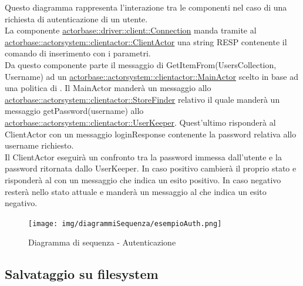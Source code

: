 \documentclass{scalatekids-article}
\begin{document}
Questo diagramma rappresenta l'interazione tra le componenti nel caso di una richiesta di autenticazione di un utente.\\
La componente \hyperref[sec:actorbase::driver::client::Connection]{actorbase::driver::client::Connection} 
manda tramite  al \hyperref[sec:actorbase::actorsystem::clientactor::ClientActor]{actorbase::actorsystem::clientactor::ClientActor} 
una string RESP contenente il comando di inserimento  con 
i parametri.\\ %
Da questo componente parte il messaggio di GetItemFrom(UsersCollection, Username) ad un \hyperref[sec:actorbase::actorsystem::clientactor::MainActor]{actorbase::actorsystem::clientactor::MainActor} scelto in base ad una 
politica di . Il MainActor manderà un messaggio allo \hyperref[sec:actorbase::actorsystem::clientactor::StoreFinder]{actorbase::actorsystem::clientactor::StoreFinder} relativo il quale manderà un messaggio getPassword(username) allo \hyperref[sec:actorbase::actorsystem::clientactor::UserKeeper]{actorbase::actorsystem::clientactor::UserKeeper}. Quest'ultimo risponderà al ClientActor con un messaggio loginResponse contenente la password relativa allo username richiesto.\\
Il ClientActor eseguirà un confronto tra la password immessa dall'utente e la password ritornata dallo UserKeeper. In caso positivo cambierà il proprio stato 
e risponderà al  con un messaggio che indica un esito positivo. In caso negativo resterà nello stato attuale e manderà un messaggio al  che indica un esito negativo.
\begin{figure}[H]
  \begin{center}
    \texttt{[image: img/diagrammiSequenza/esempioAuth.png]}
    \caption{Diagramma di sequenza - Autenticazione}
  \end{center}
\end{figure}

\subsection{Salvataggio su filesystem}
\end{document}
